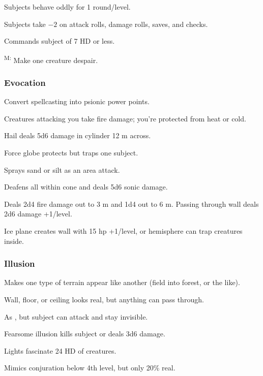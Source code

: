 	 Subjects behave oddly for 1 round/level.

	 Subjects take $-2$ on attack rolls, damage rolls, saves, and checks.

	 Commands subject of 7 HD or less.

	\textsuperscript{M:} Make one creature despair.

\subsubsection{Evocation}
	 Convert spellcasting into psionic power points.

	 Creatures attacking you take fire damage; you're protected from heat or cold.

	 Hail deals 5d6 damage in cylinder 12 m across.

	 Force globe protects but traps one subject.

	 Sprays sand or silt as an area attack. %

	 Deafens all within cone and deals 5d6 sonic damage.

	 Deals 2d4 fire damage out to 3 m and 1d4 out to 6 m. Passing through wall deals 2d6 damage +1/level.

	 Ice plane creates wall with 15 hp +1/level, or hemisphere can trap creatures inside.

\subsubsection{Illusion}
	 Makes one type of terrain appear like another (field into forest, or the like).

	 Wall, floor, or ceiling looks real, but anything can pass through.

	 As , but subject can attack and stay invisible.

	 Fearsome illusion kills subject or deals 3d6 damage.

	 Lights fascinate 24 HD of creatures.

	 Mimics conjuration below 4th level, but only 20\% real.

